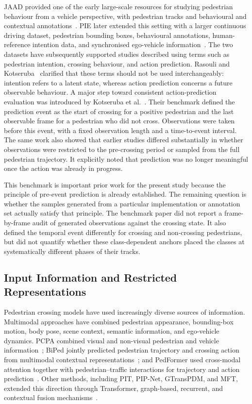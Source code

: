 \documentclass[mti,article,submit,moreauthors]{Definitions/mdpi}
\begin{document}
JAAD provided one of the early large-scale resources for studying pedestrian behaviour from a vehicle perspective, with pedestrian tracks and behavioural and contextual annotations~\citep{rasouli2017jaad}. PIE later extended this setting with a larger continuous driving dataset, pedestrian bounding boxes, behavioural annotations, human-reference intention data, and synchronised ego-vehicle information~\citep{rasouli2019pie}. The two datasets have subsequently supported studies described using terms such as pedestrian intention, crossing behaviour, and action prediction. Rasouli and Kotseruba~\citep{rasouli2024diving} clarified that these terms should not be used interchangeably: intention refers to a latent state, whereas action prediction concerns a future observable behaviour. A major step toward consistent action-prediction evaluation was introduced by Kotseruba et al.~\citep{kotseruba2021benchmark}. Their benchmark defined the prediction event as the start of crossing for a positive pedestrian and the last observable frame for a pedestrian who did not cross. Observations were taken before this event, with a fixed observation length and a time-to-event interval. The same work also showed that earlier studies differed substantially in whether observations were restricted to the pre-crossing period or sampled from the full pedestrian trajectory. It explicitly noted that prediction was no longer meaningful once the action was already in progress.

This benchmark is important prior work for the present study because the principle of pre-event prediction is already established. The remaining question is whether the samples generated from a particular implementation or annotation set actually satisfy that principle. The benchmark paper did not report a frame-by-frame audit of generated observations against the crossing state. It also defined the temporal event differently for crossing and non-crossing pedestrians, but did not quantify whether these class-dependent anchors placed the classes at systematically different phases of their tracks.


\subsection{Input Information and Restricted Representations}

Pedestrian crossing models have used increasingly diverse sources of information. Multimodal approaches have combined pedestrian appearance, bounding-box motion, body pose, scene context, semantic information, and ego-vehicle dynamics. PCPA combined visual and non-visual pedestrian and vehicle information~\citep{kotseruba2021benchmark}; BiPed jointly predicted pedestrian trajectory and crossing action from multimodal contextual representations~\citep{rasouli2021biped}; and PedFormer used cross-modal attention together with pedestrian--traffic interactions for trajectory and action prediction~\citep{rasouli2023pedformer}. Other methods, including PIT, PIP-Net, GTransPDM, and MFT, extended this direction through Transformer, graph-based, recurrent, and contextual fusion mechanisms~\citep{zhou2023pit,azarmi2025pipnet,xie2025gtranspdm,li2025mft}.
\end{document}
